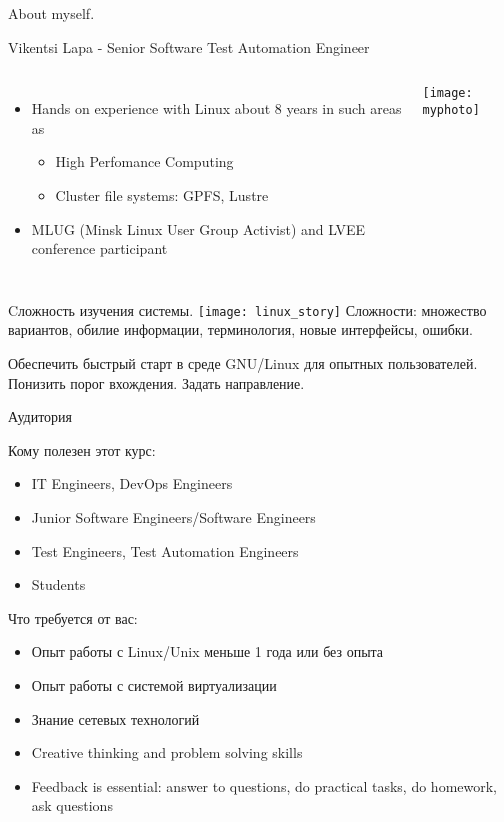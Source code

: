 \begin{frame}{About myself.}

    \large Vikentsi Lapa - Senior Software Test Automation Engineer
    \begin{columns}
            \begin{itemize}
                \item Hands on experience with Linux about 8 years in such areas as
                \begin{itemize}
                    \item High Perfomance Computing
                    \item Cluster file systems: GPFS, Lustre 
                \end{itemize}
                \item MLUG (Minsk Linux User Group Activist) and LVEE conference participant 
            \end{itemize}
            \center\texttt{[image: myphoto]}
    \end{columns}
\end{frame}

\begin{frame}{Cложность изучения системы.}
         \center\texttt{[image: linux\_story]} 
    \break
\pause
Сложности: множество вариантов, обилие информации, терминология, новые интерфейсы, ошибки.
\pause
	\begin{center}
		\large
		Обеспечить быстрый старт в среде GNU/Linux для опытных пользователей. Понизить порог вхождения. Задать направление. 
	\end{center} 
\end{frame}


\begin{frame}{Аудитория}

Кому полезен этот курс:
\begin{itemize}
    \item IT Engineers, DevOps Engineers
    \item Junior Software Engineers/Software Engineers
    \item Test Engineers, Test Automation Engineers
    \item Students
\end{itemize}
    \pause
Что требуется от вас:
\begin{itemize}
    \item Опыт работы с Linux/Unix меньше 1 года или без опыта
    \pause
    \item Опыт работы с системой виртуализации
    \item Знание сетевых технологий
    \item Creative thinking and problem solving skills
    \pause
    \item \alert{Feedback is essential: answer to questions, do practical tasks, do homework, ask questions}
\end{itemize}
\end{frame}

